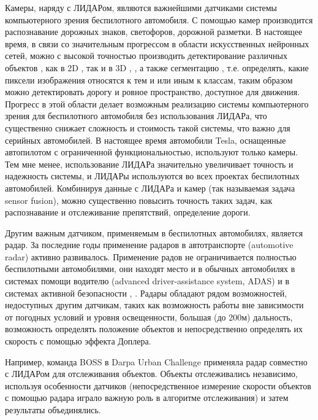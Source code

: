 Камеры, наряду с ЛИДАРом, являются важнейшими датчиками системы компьютерного зрения беспилотного автомобиля.
С помощью камер производится распознавание дорожных знаков, светофоров, дорожной разметки. В настоящее время,
в связи со значительным прогрессом в области искусственных нейронных сетей, можно с высокой точностью производить
детектирование различных объектов \cite{cv_nn_object2d_review}, как в 2D \cite{cv_nn_object2d_ssd2}, так и в 3D
\cite{cv_nn_object3d_voxelnet2}, \cite{cv_nn_object3d_pointnet2}, а также
сегментацию \cite{cv_nn_segmentation_deeplabv3}, т.е. определять, какие пиксели изображения относятся к тем и или иным к классам, таким образом
можно детектировать дорогу и ровное пространство, доступное для движения. Прогресс в этой области делает возможным реализацию системы компьютерного
зрения для беспилотного автомобиля без использования ЛИДАРа, что существенно снижает сложность и стоимость такой
системы, что важно для серийных автомобилей. В настоящее время автомобили Tesla, оснащенные автопилотом
с ограниченной функциональностью, используют только камеры. Тем мне менее, использование ЛИДАРа
значительно увеличивает точность и надежность системы, и ЛИДАРы используются во всех проектах
беспилотных автомобилей. Комбинируя данные с ЛИДАРа и камер (так называемая задача sensor fusion), можно
существенно повысить точность таких задач, как распознавание и отслеживание препятствий, определение дороги.

Другим важным датчиком, применяемым в беспилотных автомобилях, является радар. За последние годы применение радаров
в автотранспорте (automotive radar) активно развивалось. Применение радов не ограничивается полностью беспилотными
автомобилями, они находят место и в обычных автомобилях в системах помощи водителю (advanced driver-assistance
system, ADAS) и в системах активной безопасности \cite{sensor_radar_overview}, \cite{sensor_radar_overview_2}.
Радары обладают рядом возможностей, недоступных другим датчикам, таких как возможность работы вне зависимости от
погодных условий и уровня освещенности, большая (до 200м) дальность, возможность определять положение
объектов и непосредственно определять их скорость с помощью эффекта Доплера.

Например, команда BOSS \cite{darpa_boss} в Darpa Urban Challenge применяла радар совместно с ЛИДАРом для отслеживания
объектов. Объекты отслеживались независимо, используя особенности датчиков (непосредственное измерение скорости объектов
с помощью радара играло важную роль в алгоритме отслеживания) и затем результаты объединялись.

